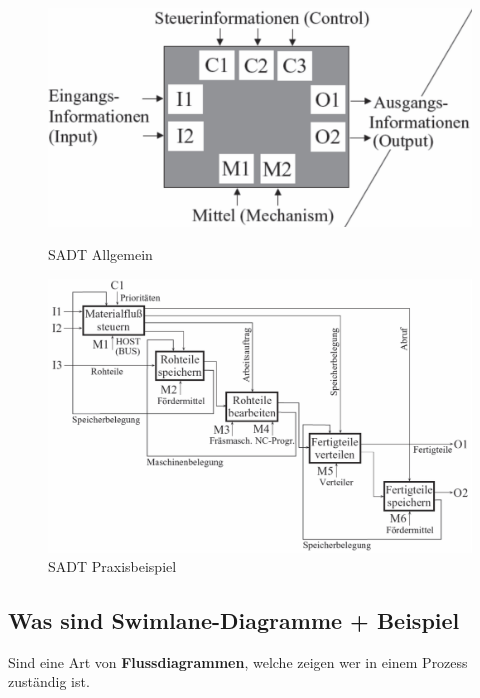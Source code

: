\begin{figure}[H]
    \centering
    \begin{minipage}[t]{0.45\textwidth}  %
        \centering
        \includegraphics[width=\linewidth]{Bilder/Teil1_SADT_Allgemein.png} %
        \caption{SADT Allgemein}
    \end{minipage} \hfill
    \begin{minipage}[t]{0.45\textwidth}  %
        \centering
        \includegraphics[width=\linewidth]{Bilder/Teil1_SADT_Beispiel.png} %
        \caption{SADT Praxisbeispiel}
    \end{minipage}
\end{figure}




\subsection{Was sind Swimlane-Diagramme + Beispiel}
Sind eine Art von \textbf{Flussdiagrammen}, welche zeigen wer in einem Prozess zuständig ist.

